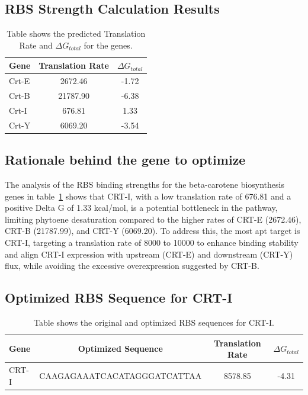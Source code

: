\documentclass[12pt,a4paper]{article}
\begin{document}
\subsection{RBS Strength Calculation Results}

\begin{table}[h]
    \centering
    \begin{tabular}{|l|c|c|}
        \hline
        \textbf{Gene} & Translation Rate & $\Delta G_{total}$ \\
        \hline
        Crt-E         & 2672.46          & -1.72              \\
        \hline
        Crt-B         & 21787.90         & -6.38              \\
        \hline
        Crt-I         & 676.81           & 1.33               \\
        \hline
        Crt-Y         & 6069.20          & -3.54              \\
        \hline
    \end{tabular}
    \caption{\centering Table shows the predicted Translation Rate and $\Delta G_{total}$ for the genes.}\label{tab:rbs_strength}
\end{table}

\subsection{Rationale behind the gene to optimize}
The analysis of the RBS binding strengths for the beta-carotene biosynthesis
genes in table~\ref{tab:rbs_strength} shows that CRT-I, with a low translation
rate of 676.81 and a positive Delta G of 1.33 kcal/mol, is a potential
bottleneck in the pathway, limiting phytoene desaturation compared to the
higher rates of CRT-E (2672.46), CRT-B (21787.99), and CRT-Y (6069.20). To
address this, the most apt target is CRT-I, targeting a translation rate of
8000 to 10000 to enhance binding stability and align CRT-I expression with
upstream (CRT-E) and downstream (CRT-Y) flux, while avoiding the excessive
overexpression suggested by CRT-B.

\subsection{Optimized RBS Sequence for CRT-I}

\begin{table}[h]
    \centering
    \begin{tabular}{|l|c|c|c|}
        \hline
        \textbf{Gene} & \textbf{Optimized Sequence} & \textbf{Translation Rate} & \textbf{$\Delta G_{total}$} \\
        \hline
        CRT-I         & CAAGAGAAATCACATAGGGATCATTAA & 8578.85                   & -4.31                       \\
        \hline
    \end{tabular}
    \caption{\centering Table shows the original and optimized RBS sequences for CRT-I.}\label{tab:optimized_rbs}
\end{table}
\end{document}

